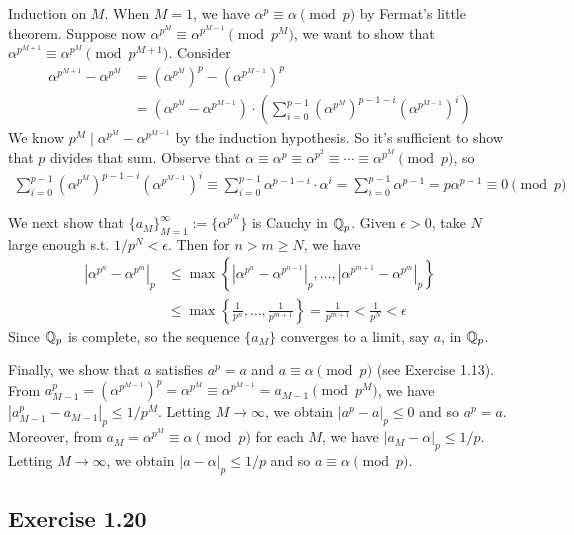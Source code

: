 \documentclass[../Koblitz.tex]{subfiles}
\begin{document}
Induction on $M$. When $M=1$, we have $\alpha^p\equiv\alpha\pmod{p}$ by Fermat's little theorem. Suppose now $\alpha^{p^M}\equiv\alpha^{p^{M-1}} \pmod{p^M}$, we want to show that $\alpha^{p^{M+1}}\equiv\alpha^{p^M} \pmod{p^{M+1}}$. Consider
\begin{align*}
    \alpha^{p^{M+1}}-\alpha^{p^M} &= \left(\alpha^{p^M}\right)^p - \left(\alpha^{p^{M-1}}\right)^p \\
    &= \left(\alpha^{p^M}-\alpha^{p^{M-1}}\right)\cdot \left(\sum_{i=0}^{p-1} \left(\alpha^{p^M}\right)^{p-1-i}\left(\alpha^{p^{M-1}}\right)^i\right)
\end{align*}
We know $p^M\mid\alpha^{p^M}-\alpha^{p^{M-1}}$ by the induction hypothesis. So it's sufficient to show that $p$ divides that sum. Observe that $\alpha\equiv\alpha^p\equiv\alpha^{p^2}\equiv\cdots\equiv\alpha^{p^M} \pmod{p}$, so
\begin{align*}
    \sum_{i=0}^{p-1} \left(\alpha^{p^M}\right)^{p-1-i}\left(\alpha^{p^{M-1}}\right)^i \equiv \sum_{i=0}^{p-1} \alpha^{p-1-i}\cdot\alpha^i = \sum_{i=0}^{p-1} \alpha^{p-1} = p\alpha^{p-1} \equiv 0 \pmod{p}
\end{align*}

We next show that $\{a_M\}_{M=1}^\infty:=\{\alpha^{p^M}\}$ is Cauchy in $\mathbb{Q}_p$. Given $\epsilon>0$, take $N$ large enough s.t. $1/p^N<\epsilon$. Then for $n>m\geq N$, we have
\begin{align*}
    \left|\alpha^{p^n}-\alpha^{p^m}\right|_p &\leq \max\left\{ \left|\alpha^{p^n}-\alpha^{p^{n-1}}\right|_p,\ldots,\left|\alpha^{p^{m+1}}-\alpha^{p^m}\right|_p \right\} \\
    &\leq \max \left\{ \frac{1}{p^n},\ldots,\frac{1}{p^{m+1}} \right\} = \frac{1}{p^{m+1}} < \frac{1}{p^N} <\epsilon
\end{align*}
Since $\mathbb{Q}_p$ is complete, so the sequence $\{a_M\}$ converges to a limit, say $a$, in $\mathbb{Q}_p$.

Finally, we show that $a$ satisfies $a^p=a$ and $a\equiv\alpha\pmod{p}$ (see Exercise 1.13). From $a_{M-1}^p = (\alpha^{p^{M-1}})^p= \alpha^{p^M} \equiv \alpha^{p^{M-1}} = a_{M-1} \pmod{p^M}$, we have $|a_{M-1}^p-a_{M-1}|_p\leq 1/p^M$. Letting $M\to\infty$, we obtain $|a^p-a|_p\leq 0$ and so $a^p=a$. Moreover, from $a_M = \alpha^{p^M} \equiv\alpha\pmod{p}$ for each $M$, we have $|a_M-\alpha|_p\leq 1/p$. Letting $M\to\infty$, we obtain $|a-\alpha|_p\leq 1/p$ and so $a\equiv\alpha\pmod{p}$.

\subsection*{Exercise 1.20}
\end{document}
